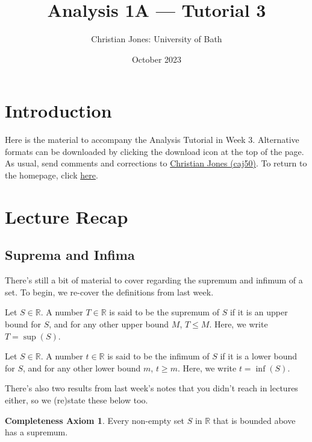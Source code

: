 \documentclass[
  10pt,
  a4paper]{article}
\title{Analysis 1A --- Tutorial 3}
\author{Christian Jones: University of Bath}
\date{October 2023}
\theoremstyle{plain}
\theoremstyle{definition}
\theoremstyle{plain}
\theoremstyle{plain}
\theoremstyle{plain}
\theoremstyle{plain}
\theoremstyle{definition}
\theoremstyle{definition}
\newtheorem*{Completeness Axiom*}{Completeness Axiom}\newtheorem{Completeness Axiom}{Completeness Axiom}[section]
\theoremstyle{remark}
\theoremstyle{remark}
\let\BeginKnitrBlock\begin \let\EndKnitrBlock\end
\begin{document}
\maketitle

{
\setcounter{tocdepth}{2}
\tableofcontents
}
\newpage
{}

\hypertarget{introduction}{%
\section*{Introduction}\label{introduction}}

Here is the material to accompany the Analysis Tutorial in Week 3. Alternative formats can be downloaded by clicking the download icon at the top of the page. As usual, send comments and corrections to \href{mailto:caj50@bath.ac.uk}{Christian Jones (caj50)}. To return to the homepage, click \href{http://caj50.github.io/tutoring.html}{here}.

\hypertarget{lecture-recap}{%
\section{Lecture Recap}\label{lecture-recap}}

\hypertarget{suprema-and-infima}{%
\subsection{Suprema and Infima}\label{suprema-and-infima}}

There's still a bit of material to cover regarding the supremum and infimum of a set. To begin, we re-cover the definitions from last week.
\BeginKnitrBlock{definition}[Supremum]
{\label{def:def1} }Let \(S \in \mathbb{R}\). A number \(T \in \mathbb{R}\) is said to be the supremum of \(S\) if it is an upper bound for \(S\), and for any other upper bound \(M\), \(T \leq M\). Here, we write \(T = \sup(S)\).
\EndKnitrBlock{definition}

\BeginKnitrBlock{definition}[Infimum]
{\label{def:def2} }Let \(S \in \mathbb{R}\). A number \(t \in \mathbb{R}\) is said to be the infimum of \(S\) if it is a lower bound for \(S\), and for any other lower bound \(m\), \(t\geq m\). Here, we write \(t = \inf(S)\).
\EndKnitrBlock{definition}
There's also two results from last week's notes that you didn't reach in lectures either, so we (re)state these below too.
\BeginKnitrBlock{Completeness Axiom*}
{}Every non-empty set \(S\) in \(\mathbb{R}\) that is bounded above has a supremum.
\EndKnitrBlock{Completeness Axiom*}
\end{document}
